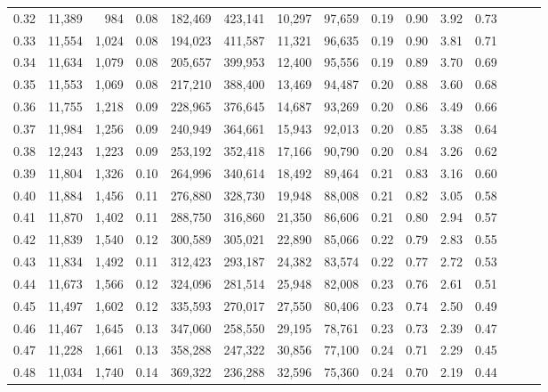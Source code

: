 \begin{tabular}{rrrrrrrrrrrrrrr}
0.32 &  11,389 &    984 &  0.08 &  182,469 &  423,141 &   10,297 &   97,659 &  0.19 &  0.90 &  3.92 &      0.73 \\
0.33 &  11,554 &  1,024 &  0.08 &  194,023 &  411,587 &   11,321 &   96,635 &  0.19 &  0.90 &  3.81 &      0.71 \\
0.34 &  11,634 &  1,079 &  0.08 &  205,657 &  399,953 &   12,400 &   95,556 &  0.19 &  0.89 &  3.70 &      0.69 \\
0.35 &  11,553 &  1,069 &  0.08 &  217,210 &  388,400 &   13,469 &   94,487 &  0.20 &  0.88 &  3.60 &      0.68 \\
0.36 &  11,755 &  1,218 &  0.09 &  228,965 &  376,645 &   14,687 &   93,269 &  0.20 &  0.86 &  3.49 &      0.66 \\
0.37 &  11,984 &  1,256 &  0.09 &  240,949 &  364,661 &   15,943 &   92,013 &  0.20 &  0.85 &  3.38 &      0.64 \\
0.38 &  12,243 &  1,223 &  0.09 &  253,192 &  352,418 &   17,166 &   90,790 &  0.20 &  0.84 &  3.26 &      0.62 \\
0.39 &  11,804 &  1,326 &  0.10 &  264,996 &  340,614 &   18,492 &   89,464 &  0.21 &  0.83 &  3.16 &      0.60 \\
0.40 &  11,884 &  1,456 &  0.11 &  276,880 &  328,730 &   19,948 &   88,008 &  0.21 &  0.82 &  3.05 &      0.58 \\
0.41 &  11,870 &  1,402 &  0.11 &  288,750 &  316,860 &   21,350 &   86,606 &  0.21 &  0.80 &  2.94 &      0.57 \\
0.42 &  11,839 &  1,540 &  0.12 &  300,589 &  305,021 &   22,890 &   85,066 &  0.22 &  0.79 &  2.83 &      0.55 \\
0.43 &  11,834 &  1,492 &  0.11 &  312,423 &  293,187 &   24,382 &   83,574 &  0.22 &  0.77 &  2.72 &      0.53 \\
0.44 &  11,673 &  1,566 &  0.12 &  324,096 &  281,514 &   25,948 &   82,008 &  0.23 &  0.76 &  2.61 &      0.51 \\
0.45 &  11,497 &  1,602 &  0.12 &  335,593 &  270,017 &   27,550 &   80,406 &  0.23 &  0.74 &  2.50 &      0.49 \\
0.46 &  11,467 &  1,645 &  0.13 &  347,060 &  258,550 &   29,195 &   78,761 &  0.23 &  0.73 &  2.39 &      0.47 \\
0.47 &  11,228 &  1,661 &  0.13 &  358,288 &  247,322 &   30,856 &   77,100 &  0.24 &  0.71 &  2.29 &      0.45 \\
0.48 &  11,034 &  1,740 &  0.14 &  369,322 &  236,288 &   32,596 &   75,360 &  0.24 &  0.70 &  2.19 &      0.44 \\

\end{tabular}
